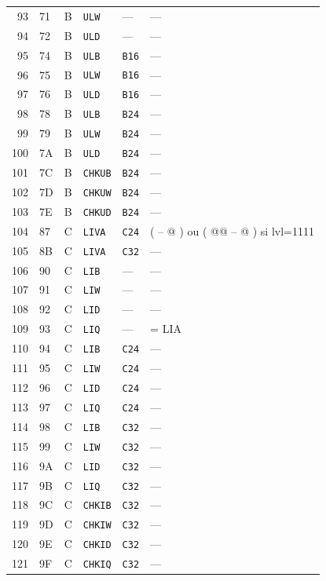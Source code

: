 \documentclass[10pt,a4paper,twoside,openany]{book}
\begin{document}
\begin{landscape}
\begin{longtable}{@{}r l c l l p{10.7cm}@{}}
93 & 71 & B & \texttt{ULW} & --- & ---\\
94 & 72 & B & \texttt{ULD} & --- & ---\\
95 & 74 & B & \texttt{ULB} & \texttt{B16} & ---\\
96 & 75 & B & \texttt{ULW} & \texttt{B16} & ---\\
97 & 76 & B & \texttt{ULD} & \texttt{B16} & ---\\
98 & 78 & B & \texttt{ULB} & \texttt{B24} & ---\\
99 & 79 & B & \texttt{ULW} & \texttt{B24} & ---\\
100 & 7A & B & \texttt{ULD} & \texttt{B24} & ---\\
101 & 7C & B & \texttt{CHKUB} & \texttt{B24} & ---\\
102 & 7D & B & \texttt{CHKUW} & \texttt{B24} & ---\\
103 & 7E & B & \texttt{CHKUD} & \texttt{B24} & ---\\
104 & 87 & C & \texttt{LIVA} & \texttt{C24} & ( -- @ )  ou  ( @@ -- @ ) si lvl=1111\\
105 & 8B & C & \texttt{LIVA} & \texttt{C32} & ---\\
106 & 90 & C & \texttt{LIB} & --- & ---\\
107 & 91 & C & \texttt{LIW} & --- & ---\\
108 & 92 & C & \texttt{LID} & --- & ---\\
109 & 93 & C & \texttt{LIQ} & --- & = LIA\\
110 & 94 & C & \texttt{LIB} & \texttt{C24} & ---\\
111 & 95 & C & \texttt{LIW} & \texttt{C24} & ---\\
112 & 96 & C & \texttt{LID} & \texttt{C24} & ---\\
113 & 97 & C & \texttt{LIQ} & \texttt{C24} & ---\\
114 & 98 & C & \texttt{LIB} & \texttt{C32} & ---\\
115 & 99 & C & \texttt{LIW} & \texttt{C32} & ---\\
116 & 9A & C & \texttt{LID} & \texttt{C32} & ---\\
117 & 9B & C & \texttt{LIQ} & \texttt{C32} & ---\\
118 & 9C & C & \texttt{CHKIB} & \texttt{C32} & ---\\
119 & 9D & C & \texttt{CHKIW} & \texttt{C32} & ---\\
120 & 9E & C & \texttt{CHKID} & \texttt{C32} & ---\\
121 & 9F & C & \texttt{CHKIQ} & \texttt{C32} & ---\\

\end{longtable}
\end{landscape}
\end{document}
